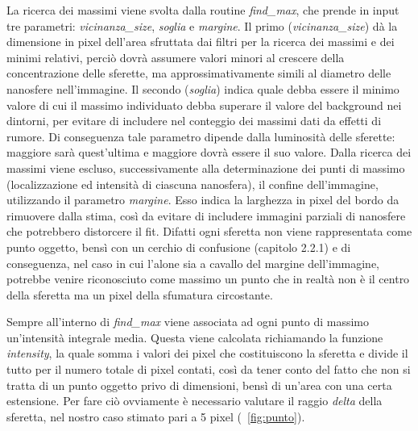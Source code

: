 La ricerca dei massimi viene svolta dalla routine \textit{find\_max}, che prende in input tre parametri: \textit{vicinanza\_size}, \textit{soglia} e \textit{margine}.
Il primo (\textit{vicinanza\_size}) dà la dimensione in pixel dell'area sfruttata dai filtri per la ricerca dei massimi e dei minimi relativi, perciò dovrà assumere valori minori al crescere della concentrazione delle sferette, ma approssimativamente simili al diametro delle nanosfere nell'immagine. 
Il secondo (\textit{soglia}) indica quale debba essere il minimo valore di cui il massimo individuato debba superare il valore del background nei dintorni, per evitare di includere nel conteggio dei massimi dati da effetti di rumore.
Di conseguenza tale parametro dipende dalla luminosità delle sferette: maggiore sarà quest'ultima e maggiore dovrà essere il suo valore.
Dalla ricerca dei massimi viene escluso, successivamente alla determinazione dei punti di massimo (localizzazione ed intensità di ciascuna nanosfera), il confine dell'immagine, utilizzando il parametro \textit{margine}.
Esso indica la larghezza in pixel del bordo da rimuovere dalla stima, così da evitare di includere immagini parziali di nanosfere che potrebbero distorcere il fit.
Difatti ogni sferetta non viene rappresentata come punto oggetto, bensì con un cerchio di confusione (capitolo 2.2.1) e di conseguenza, nel caso in cui l'alone sia a cavallo del margine dell'immagine, potrebbe venire riconosciuto come massimo un punto che in realtà non è il centro della sferetta ma un pixel della sfumatura circostante.

Sempre all'interno di \textit{find\_max} viene associata ad ogni punto di massimo un'intensità integrale media. 
Questa viene calcolata richiamando la funzione \textit{intensity}, la quale somma i valori dei pixel che costituiscono la sferetta e divide il tutto per il numero totale di pixel contati, così da tener conto del fatto che non si tratta di un punto oggetto privo di dimensioni, bensì di un'area con una certa estensione. 
Per fare ciò ovviamente è necessario valutare il raggio \textit{delta} della sferetta, nel nostro caso stimato pari a 5 pixel (\figurename~\ref{fig:punto}).

